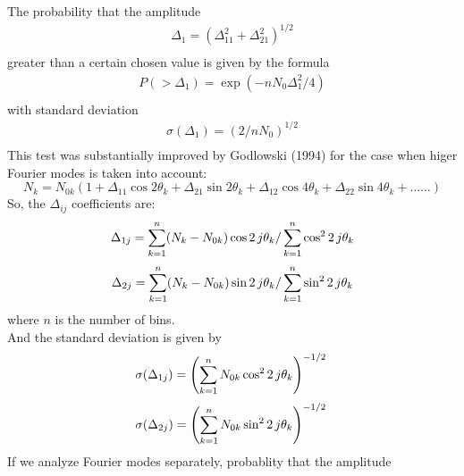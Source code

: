 The probability that the amplitude
\begin{equation}
\begin{array}{l}
\Delta_{1} = (\Delta_{11}^2 + \Delta_{21}^2)^{1/2} \\
\end{array}
\end{equation}
greater than a certain chosen value is given by the formula
\begin{equation}
\begin{array}{l}
P(>\Delta_{1}) = \exp(-nN_{0}\Delta_{1}^2/4) \\
\end{array}
\end{equation}
with standard deviation
\begin{equation}
\begin{array}{l}
\sigma (\Delta_{1}) = (2/nN_{0})^{1/2} \\
\end{array}
\end{equation}
This test was substantially improved by Godlowski (1994) for the case when higer Fourier modes is taken into account:
\begin{equation}\label{four_higher}
N_k=N_{0k}\left(1+\Delta_{11}\cos2\theta_k + \Delta_{21} \sin 2\theta_k + \Delta_{12} \cos 4\theta_k + \Delta_{22} \sin 4\theta_k + \ldots\ldots\right)
\end{equation}
\noindent So, the $\Delta_{ij}$ coefficients are:
\begin{equation}
\Delta_{1j} = \sum_{k=1}^n (N_{k}-N_{0k}) \cos 2\,j\theta_{k} / \sum_{k=1}^n \cos^2 2\,j\theta_{k} \\
\end{equation}
\begin{equation}
\Delta_{2j} = \sum_{k=1}^n (N_{k}-N_{0k}) \sin 2\,j\theta_{k} / \sum_{k=1}^n \sin^2 2\,j\theta_{k} \\
\end{equation}
where $n$ is the number of bins.\\
And the standard deviation is given by
\begin{equation}
\sigma (\Delta_{1j}) = \left(\sum_{k=1}^n N_{0k} \cos^2 2\,j\theta_{k}\right)^{-1/2} \\
\end{equation}
\begin{equation}
\sigma (\Delta_{2j}) =\left(\sum_{k=1}^n N_{0k} \sin^2 2\,j\theta_{k}\right)^{-1/2} \\
\end{equation}
\noindent If we analyze Fourier modes separately, probablity that the amplitude
